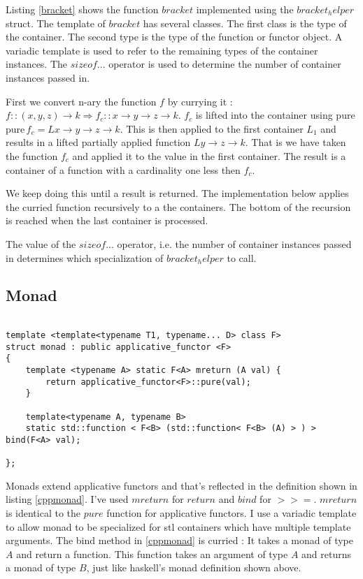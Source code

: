 \documentclass[12pt,fleqn]{article}
\begin{document}
Listing \ref{bracket} shows the function $bracket$ implemented using the $bracket_helper$ struct. 
The template of $bracket$ has several classes.
The first class is the type of the container. The second type is the type of the function or functor object.
A variadic template is used to refer to the remaining types of the container instances. 
The $sizeof...$ operator is used to determine the number of container instances passed in.


First we convert n-ary the function $f$ by currying it : $f::(x,y,z) \rightarrow k \Rightarrow f_c::x \rightarrow y \rightarrow z \rightarrow k$. 
$f_c$ is lifted into the container using pure $ \mbox{pure} \, f_c = L x \rightarrow y \rightarrow z \rightarrow k$. 
This is  then applied to the first container $L_1$ and results in a lifted partially applied function $L y \rightarrow z \rightarrow k$. 
That is we have taken the function $f_c$ and applied it to the value in the first container. The result is a container of a function 
with a cardinality one less then $f_c$.

We keep doing this until a result is returned.
The implementation below applies the curried function recursively to a the containers. 
The bottom of the recursion is reached when the last container is processed.

The value of the $sizeof...$ operator, i.e. the number of container instances passed in determines which specialization of  
$bracket_helper$ to call.


%
%
%
\subsection{Monad}
%
%
%
\begin{minipage}{\linewidth}
\begin{lstlisting}[caption=monad defintion in C++, label=cppmonad]

template <template<typename T1, typename... D> class F> 
struct monad : public applicative_functor <F>
{
	template <typename A> static F<A> mreturn (A val) {
		return applicative_functor<F>::pure(val);
	}

	template<typename A, typename B>
	static std::function < F<B> (std::function< F<B> (A) > ) > bind(F<A> val);
	
};

\end{lstlisting}
\end{minipage}
%
%
%

Monads extend applicative functors and that's reflected in the definition shown in listing \ref{cppmonad}.
I've used $mreturn$ for $return$ and $bind$ for $>>=$.
$mreturn$ is identical to the $pure$ function for applicative functors.
I use a variadic template to allow monad to be specialized for stl containers which have multiple template arguments. 
The bind method in \ref{cppmonad} is curried : It takes a monad of type $A$ and return a function.
This function takes an argument of type $A$ and returns a monad of type $B$, just like haskell's monad definition shown above.
\end{document}
